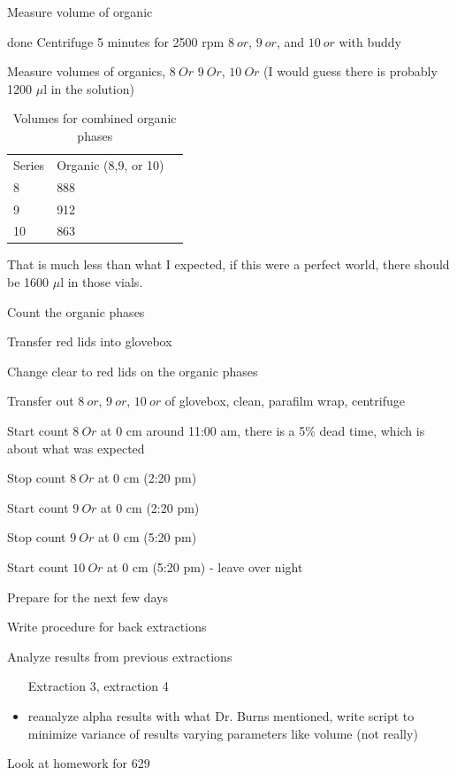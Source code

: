 \documentclass[idxtotoc,hyperref,openany,oneside]{labbook} %
\newcommand{\cmark}{\ding{51}}%
\newcommand{\done}{\rlap{$\square$}{\raisebox{2pt}{\large\hspace{1pt}\cmark}}%
  \hspace{-2.5pt}}
\begin{document}
Measure volume of organic

\begin{todolist}
\item[done]{Centrifuge 5 minutes for 2500 rpm $\boxed{8\ or}$,
  $\boxed{9\ or}$, and $\boxed{10\ or}$ with buddy}
\item[\done]{Measure volumes of organics, $\boxed{8\ Or}$
  $\boxed{9\ Or}$, $\boxed{10\ Or}$ (I would guess there
  is probably 1200 $\mu$l in the solution)}
\begin{table}[H]
  \begin{center}
    \caption{Volumes for combined organic phases}
    \begin{tabular}{l l l}
      \toprule
      Series & Organic (8,9, or 10)\\ 
      8 & 888\\
      9 & 912\\
      10 & 863\\
      \bottomrule
    \end{tabular}
  \end{center}
\end{table}  
\end{todolist}
That is much less than what I expected, if this were a perfect world,
there should be 1600 $\mu$l in those vials.

Count the organic phases
\begin{todolist}
\item[\done]{Transfer red lids into glovebox}
\item[\done]{Change clear to red lids on the organic phases}
\item[\done]{Transfer out $\boxed{8\ or}$, $\boxed{9\ or}$,
  $\boxed{10\ or}$ of glovebox, clean, parafilm wrap, centrifuge}
\item[\done]{Start count $\boxed{8\ Or}$ at 0 cm around 11:00 am,
  there is a 5\% dead time, which is about what was
  expected}
\item[\done]{Stop count $\boxed{8\ Or}$ at 0 cm (2:20 pm)}
\item[\done]{Start count $\boxed{9\ Or}$ at 0 cm (2:20 pm)}
\item[\done]{Stop count $\boxed{9\ Or}$ at 0 cm (5:20 pm)}
\item[\done]{Start count $\boxed{10\ Or}$ at 0 cm (5:20 pm) - leave over night}
\end{todolist}

Prepare for the next few days
\begin{todolist}
\item[\done]{Write procedure for back extractions}
\item{Analyze results from previous extractions}
  \begin{itemize}
  \item[\done]{Extraction 3, extraction 4}
  \item{ reanalyze alpha results with
    what Dr. Burns mentioned, write script to minimize variance
    of results varying parameters like volume (not really)}
  \end{itemize}
\item[\done]{Look at homework for 629}
\end{todolist}
\end{document}
